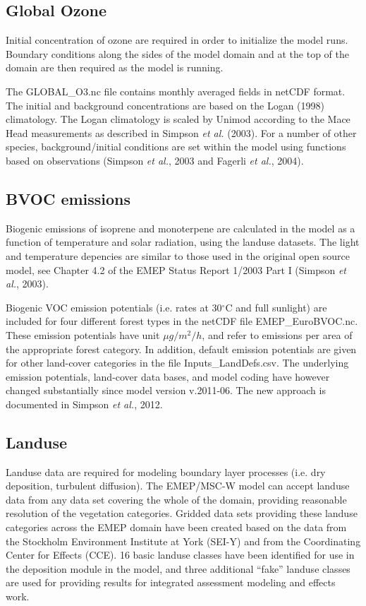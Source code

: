 \subsection{Global Ozone}
Initial concentration of ozone are required in order to
initialize the model runs. Boundary conditions along the sides of the model
domain and at the top of the domain are then required as the model is
running.

The GLOBAL\_O3.nc file contains monthly averaged fields in netCDF format. 
The initial and background
concentrations are based on the Logan (1998) climatology. The Logan
climatology is scaled by Unimod according to the Mace Head measurements as
described in Simpson {\sl et al.} (2003). For a number of other species, 
background/initial conditions are set within the model using functions 
based on observations (Simpson {\sl et al.}, 2003 and Fagerli {\sl et al.}, 2004).

\subsection{BVOC emissions}
Biogenic emissions of isoprene and monoterpene are calculated in the
model as a function of temperature and solar radiation, using the landuse
datasets. The light and temperature depencies are similar to those
used in the original open source model, see 
Chapter 4.2 of the EMEP Status Report 1/2003 Part I (Simpson
{\sl et al.}, 2003).

Biogenic VOC emission potentials (i.e. rates at 30$^\circ$C and full sunlight)
are included for four different forest types in the netCDF file 
EMEP\_EuroBVOC.nc. These emission potentials have unit $\mu g/m^{2} /h$, and
refer to emissions per area of the appropriate forest category. In 
addition, default emission potentials are given for other
land-cover categories in the file Inputs\_LandDefs.csv. 
The underlying emission potentials, land-cover data bases, and model
coding have however changed substantially since model version v.2011-06. The new approach
is documented in Simpson {\sl et al.}, 2012.

\subsection{Landuse}

Landuse data are required for modeling boundary layer processes
(i.e. dry deposition, turbulent diffusion).
The EMEP/MSC-W model can accept landuse data from any
data set covering the whole of the domain, providing reasonable 
resolution of the vegetation categories. Gridded data sets providing
these landuse categories across the EMEP domain have been created
based on the data from the Stockholm Environment Institute at York 
(SEI-Y) and from the Coordinating Center for Effects (CCE). 
16 basic landuse classes have been identified for use in the
deposition module in the model, and three additional ``fake'' landuse
classes are used for providing results for integrated assessment
modeling and effects work.

